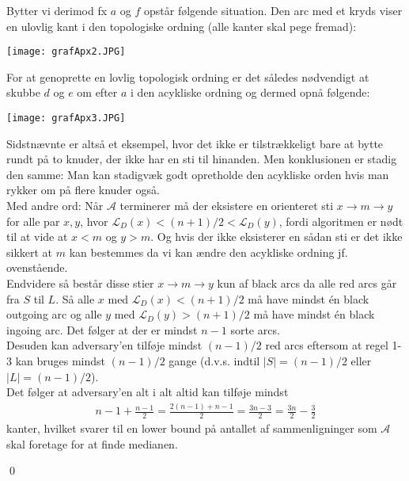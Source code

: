 Bytter vi derimod fx $a$ og $f$ opstår følgende situation. Den arc med et kryds viser en ulovlig kant i den topologiske ordning (alle kanter skal pege fremad):
\begin{center}
	\texttt{[image: grafApx2.JPG]}
\end{center}
For at genoprette en lovlig topologisk ordning er det således nødvendigt at skubbe $d$ og $e$ om efter $a$ i den acykliske ordning og dermed opnå følgende: 

\begin{center}
	\texttt{[image: grafApx3.JPG]}
\end{center}

Sidstnævnte er altså et eksempel, hvor det ikke er tilstrækkeligt bare at bytte rundt på to knuder, der ikke har en sti til hinanden. Men konklusionen er stadig den samme: Man kan stadigvæk godt opretholde den acykliske orden hvis man rykker om på flere knuder også. \\

Med andre ord: Når $\mathcal{A}$ terminerer må der eksistere en orienteret sti $x \rightarrow m \rightarrow y$ for alle par $x,y$, hvor $\mathcal{L}_D(x)<(n+1)/2<\mathcal{L}_D(y)$, fordi algoritmen er nødt til at vide at $x<m$ og $y>m$. Og hvis der ikke eksisterer en sådan sti er det ikke sikkert at $m$ kan bestemmes da vi kan ændre den acykliske ordning jf. ovenstående. \\

Endvidere så består disse stier $x \rightarrow m \rightarrow y$ kun af black arcs da alle red arcs går fra $S$ til $L$. Så alle $x$ med $\mathcal{L}_D(x)<(n+1)/2$ må have mindst én black outgoing arc og alle $y$ med $\mathcal{L}_D(y)>(n+1)/2$ må have mindst én black ingoing arc. Det følger at der er mindst $n-1$ sorte arcs. \\

Desuden kan adversary'en tilføje mindst $(n-1)/2$ red arcs eftersom at regel 1-3 kan bruges mindst $(n-1)/2$ gange (d.v.s. indtil $|S|=(n-1)/2$ eller $|L|=(n-1)/2$). \\

Det følger at adversary'en alt i alt altid kan tilføje mindst 
\begin{align*}
n-1 +\frac{n-1}{2} = \frac{2(n-1)+n-1}{2}=\frac{3n-3}{2}=\frac{3n}{2}-\frac{3}{2}
\end{align*}
kanter, hvilket svarer til en lower bound på antallet af sammenligninger som $\mathcal{A}$ skal foretage for at finde medianen. 
\begin{flushright}
	\qed
\end{flushright}

